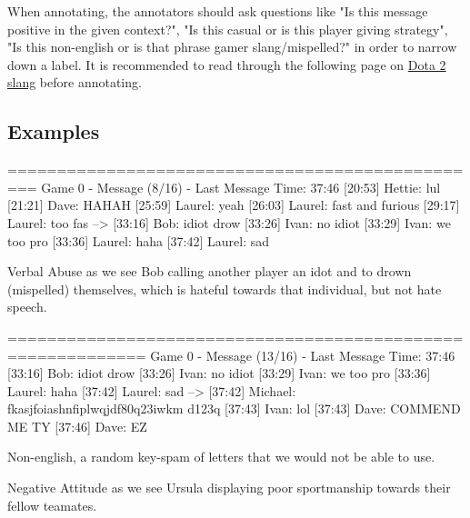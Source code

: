 \documentclass[11pt, letterpaper, notitlepage]{article}
\begin{document}
When annotating, the annotators should ask questions like "Is this message positive in the given context?", "Is this casual or is this player giving strategy",
"Is this non-english or is that phrase gamer slang/mispelled?" in order to narrow down a label. It is recommended to read through the following page on 
\href{http://dota2freaks.com/glossary/}{Dota 2 slang} before annotating.

\newpage

\subsection{Examples}


\begin{python}
 =================================================
Game 0 - Message (8/16) - Last Message Time: 37:46
    [20:53] Hettie: lul
    [21:21] Dave: HAHAH
    [25:59] Laurel: yeah 
    [26:03] Laurel: fast and furious
    [29:17] Laurel: too fas
--> [33:16] Bob: idiot drow
    [33:26] Ivan: no idiot
    [33:29] Ivan: we too pro
    [33:36] Laurel: haha
    [37:42] Laurel: sad
\end{python}
Verbal Abuse as we see Bob calling another player an idot and to drown (mispelled) themselves, which is hateful towards that individual, but not hate speech.
\vspace{2em}

\begin{python}
============================================================
Game 0 - Message (13/16) - Last Message Time: 37:46
        [33:16] Bob: idiot drow
        [33:26] Ivan: no idiot
        [33:29] Ivan: we too pro
        [33:36] Laurel: haha
        [37:42] Laurel: sad
    --> [37:42] Michael: fkasjfoiashnfiplwqjdf80q23iwkm d123q
        [37:43] Ivan: lol
        [37:43] Dave: COMMEND ME TY
        [37:46] Dave: EZ
\end{python}
Non-english, a random key-spam of letters that we would not be able to use.
\newpage

    Negative Attitude as we see Ursula displaying poor sportmanship towards their fellow teamates.
    \vspace{2em}
\end{document}
